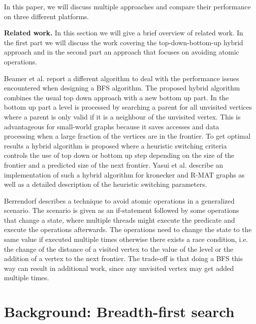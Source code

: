 \documentclass[letterpaper]{article}
\newcommand{\mypar}[1]{{\bf #1.}}
\begin{document}
In this paper, we will discuss multiple approaches and compare their performance on three different platforms.

\mypar{Related work} 
In this section we will give a brief overview of related work. In the first part we will discuss the work covering the top-down-bottom-up hybrid approach and in the second part an approach that focuses on avoiding atomic operations.

Beamer et al. \cite{beamer2011searching} report a different algorithm to deal with the performance issues encountered when designing a BFS algorithm. The proposed hybrid algorithm combines the usual top down approach with a new bottom up part. In the bottom up part a level is processed by searching a parent for all unvisited vertices where a parent is only valid if it is a neighbour of the unvisited vertex. This is advantageous for small-world graphs because it saves accesses and data processing when a large fraction of the vertices are in the frontier. To get optimal results a hybrid algorithm is proposed where a heuristic switching criteria controls the use of top down or bottom up step depending on the size of the frontier and a predicted size of the next frontier. Yasui et al. \cite{6691600} describe an implementation of such a hybrid algorithm for kronecker and R-MAT graphs as well as a detailed description of the heuristic switching parameters.


Berrendorf \cite{Berrendorf:14} describes a technique to avoid atomic operations in a generalized scenario. The scenario is given as an if-statement followed by some operations that change a state, where multiple threads might execute the predicate and execute the operations afterwards. The operations need to change the state to the same value if executed multiple times otherwise there exists a race condition, i.e. the change of the distance of a visited vertex to the value of the level or the addition of a vertex to the next frontier. The trade-off is that doing a BFS this way can result in additional work, since any unvisited vertex may get added multiple times.



\section{Background: Breadth-first search}\label{sec:background}
\end{document}
